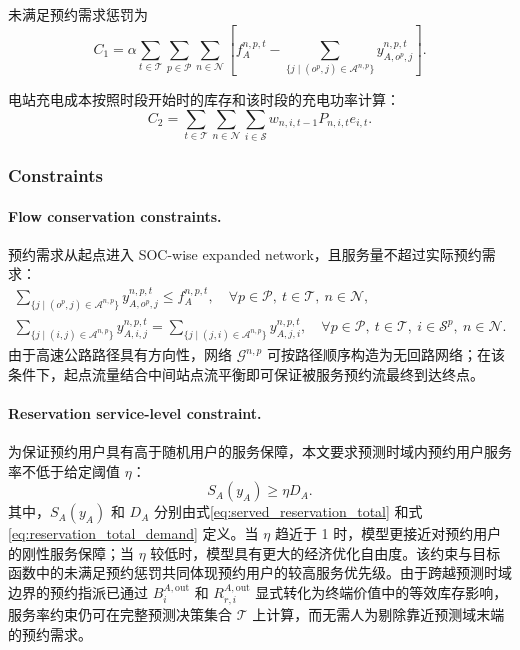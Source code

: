 \documentclass[12pt,hyperref,a4paper,UTF8]{ctexart}
\begin{document}
未满足预约需求惩罚为
\begin{equation}
C_1 = \alpha \sum_{t\in \mathcal{T}} \sum_{p\in \mathcal{P}}  \sum_{n\in \mathcal{N}} 
\left[
f_A^{n,p,t} - \sum_{\{j \mid (o^p,j) \in \mathcal{A}^{n,p}\}} y_{A,o^p,j}^{n,p,t} \right].
\label{eq:penaltycost}
\end{equation}

电站充电成本按照时段开始时的库存和该时段的充电功率计算：
\begin{equation}
C_2 = \sum_{t \in \mathcal{T}}  \sum_{n \in \mathcal{N}} \sum_{i \in \mathcal{S}}
 w_{n,i,t-1}P_{n,i,t}e_{i,t}.
\label{eq:chargingcost}
\end{equation}

\subsubsection{Constraints}

\paragraph{Flow conservation constraints.}
预约需求从起点进入 SOC-wise expanded network，且服务量不超过实际预约需求：
\begin{subequations}
\label{eq:flow}
\begin{gather}
\sum_{\{j\mid (o^p,j)\in \mathcal{A}^{n,p}\}}{y_{A,o^p,j}^{n,p,t}} \leq f_A^{n,p,t},
\quad \forall p\in \mathcal{P},\ t\in \mathcal{T},\ n \in \mathcal{N},\label{eq:flow1}\\
\sum_{\{j\mid (i,j)\in \mathcal{A}^{n,p}\}}{y_{A,i,j}^{n,p,t}} =
\sum_{\{j\mid (j,i)\in \mathcal{A}^{n,p}\}}{y_{A,j,i}^{n,p,t}},
\quad \forall p\in \mathcal{P},\ t\in \mathcal{T},\ i\in \mathcal{S}^p,
\ n\in\mathcal{N}.
\label{eq:flow2}
\end{gather}
\end{subequations}
由于高速公路路径具有方向性，网络 $\mathcal{G}^{n,p}$ 可按路径顺序构造为无回路网络；在该条件下，起点流量结合中间站点流平衡即可保证被服务预约流最终到达终点。

\paragraph{Reservation service-level constraint.}
为保证预约用户具有高于随机用户的服务保障，本文要求预测时域内预约用户服务率不低于给定阈值 $\eta$：
\begin{equation}
S_A(y_A)\ge \eta D_A.
\label{eq:reservation_service_rate}
\end{equation}
其中，$S_A(y_A)$ 和 $D_A$ 分别由式\eqref{eq:served_reservation_total} 和式\eqref{eq:reservation_total_demand} 定义。当 $\eta$ 趋近于 1 时，模型更接近对预约用户的刚性服务保障；当 $\eta$ 较低时，模型具有更大的经济优化自由度。该约束与目标函数中的未满足预约惩罚共同体现预约用户的较高服务优先级。由于跨越预测时域边界的预约指派已通过 $B_{i}^{A,\mathrm{out}}$ 和 $R_{r,i}^{A,\mathrm{out}}$ 显式转化为终端价值中的等效库存影响，服务率约束仍可在完整预测决策集合 $\mathcal{T}$ 上计算，而无需人为剔除靠近预测域末端的预约需求。
\end{document}
